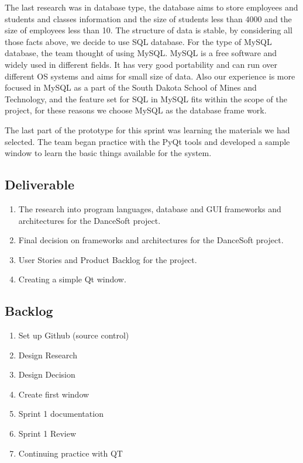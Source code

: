 The last research was in database type, the database aims to store employees and students and classes information and the size of students less than 4000 and the size of employees less than 10. The structure of data is stable, by considering all those facts above, we decide to use SQL database. For the type of MySQL database, the team thought of using MySQL. MySQL is a free software and widely used in different fields. It has very good portability and can run over different OS systems and aims for small size of data. Also our experience is more focused in MySQL as a part of the South Dakota School of Mines and Technology, and the feature set for SQL in MySQL fits within the scope of the project, for these reasons we choose MySQL as the database frame work.


The last part of the prototype for this sprint was learning the materials we had selected. The team began practice with the PyQt tools and developed a sample window to learn the basic things available for the system.\\

\subsection{Deliverable}
\begin{enumerate}
\item The research into program languages, database and GUI frameworks and architectures for the DanceSoft project.
\item Final decision on frameworks and architectures for the DanceSoft project.
\item User Stories and Product Backlog for the project.
\item Creating a simple Qt window.
\end{enumerate}

\subsection{Backlog}
\begin{enumerate}
\item Set up Github (source control)
\item Design Research
\item Design Decision
\item Create first window
\item Sprint 1 documentation
\item Sprint 1 Review
\item Continuing practice with QT

\end{enumerate}

